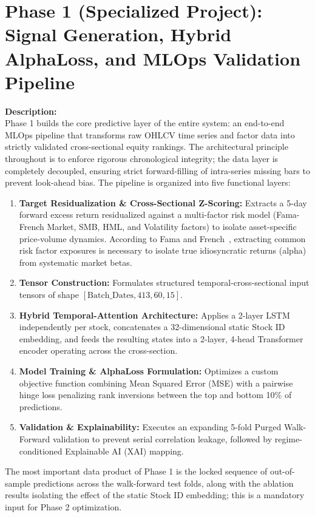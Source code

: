 \documentclass[twoside,final]{hcmut-report}
\begin{document}
\section{Phase 1 (Specialized Project): Signal Generation, Hybrid AlphaLoss, and MLOps Validation Pipeline}

\textbf{Description:} \\
Phase 1 builds the core predictive layer of the entire system: an end-to-end MLOps pipeline that transforms raw OHLCV time series and factor data into strictly validated cross-sectional equity rankings. The architectural principle throughout is to enforce rigorous chronological integrity; the data layer is completely decoupled, ensuring strict forward-filling of intra-series missing bars to prevent look-ahead bias. The pipeline is organized into five functional layers:
\begin{enumerate}
  \item \textbf{Target Residualization \& Cross-Sectional Z-Scoring:} Extracts a 5-day forward excess return residualized against a multi-factor risk model (Fama-French Market, SMB, HML, and Volatility factors) to isolate asset-specific price-volume dynamics. According to Fama and French~\cite{FamaFrench1993}, extracting common risk factor exposures is necessary to isolate true idiosyncratic returns (alpha) from systematic market betas.
  \item \textbf{Tensor Construction:} Formulates structured temporal-cross-sectional input tensors of shape $[\text{Batch\_Dates}, 413, 60, 15]$.
  \item \textbf{Hybrid Temporal-Attention Architecture:} Applies a 2-layer LSTM independently per stock, concatenates a 32-dimensional static Stock ID embedding, and feeds the resulting states into a 2-layer, 4-head Transformer encoder operating across the cross-section.
  \item \textbf{Model Training \& AlphaLoss Formulation:} Optimizes a custom objective function combining Mean Squared Error (MSE) with a pairwise hinge loss penalizing rank inversions between the top and bottom 10\% of predictions.
  \item \textbf{Validation \& Explainability:} Executes an expanding 5-fold Purged Walk-Forward validation to prevent serial correlation leakage, followed by regime-conditioned Explainable AI (XAI) mapping.
\end{enumerate}

The most important data product of Phase 1 is the locked sequence of out-of-sample predictions across the walk-forward test folds, along with the ablation results isolating the effect of the static Stock ID embedding; this is a mandatory input for Phase 2 optimization.
\end{document}
